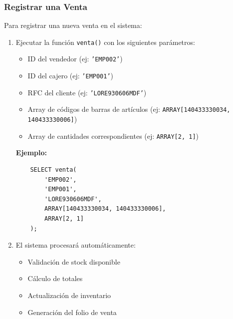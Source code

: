 \documentclass[a4paper, 12pt]{article}
\begin{document}
\subsubsection{Registrar una Venta}
Para registrar una nueva venta en el sistema:
\begin{enumerate}
    \item Ejecutar la función \texttt{venta()} con los siguientes parámetros:
    \begin{itemize}
        \item ID del vendedor (ej: \texttt{'EMP002'})
        \item ID del cajero (ej: \texttt{'EMP001'})
        \item RFC del cliente (ej: \texttt{'LORE930606MDF'})
        \item Array de códigos de barras de artículos (ej: \texttt{ARRAY[140433330034, 140433330006]})
        \item Array de cantidades correspondientes (ej: \texttt{ARRAY[2, 1]})
    \end{itemize}
    
    \textbf{Ejemplo:}
    \begin{verbatim}
    SELECT venta(
        'EMP002', 
        'EMP001', 
        'LORE930606MDF',
        ARRAY[140433330034, 140433330006],
        ARRAY[2, 1]
    );
    \end{verbatim}
    
    \item El sistema procesará automáticamente:
    \begin{itemize}
        \item Validación de stock disponible
        \item Cálculo de totales
        \item Actualización de inventario
        \item Generación del folio de venta
    \end{itemize}
\end{enumerate}
\end{document}
